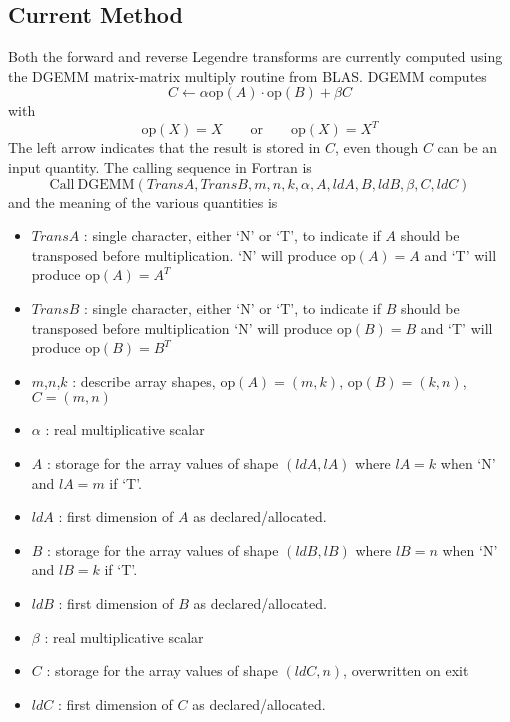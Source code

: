 \documentclass[10pt,letterpaper]{article}
\begin{document}
\subsection{Current Method}
Both the forward and reverse Legendre transforms are currently computed using the DGEMM
matrix-matrix multiply routine from BLAS. DGEMM computes
\begin{equation}
  C \leftarrow \alpha \mathrm{op}\left(A\right)\cdot\mathrm{op}\left(B\right) + \beta C
\end{equation}
with
\begin{equation}
  \mathrm{op}\left(X\right) = X
  \qquad\mathrm{or}\qquad
  \mathrm{op}\left(X\right) = X^T
\end{equation}
The left arrow indicates that the result is stored in $C$, even though $C$ can be
an input quantity. The calling sequence in Fortran is
\begin{equation}
  \mathrm{Call\ DGEMM}\left(TransA,TransB,m,n,k,\alpha,A,ldA,B,ldB,\beta,C,ldC\right)
\end{equation}
and the meaning of the various quantities is
\begin{itemize}
  \item $TransA$ : single character, either `N' or `T', to indicate if $A$ should be
        transposed before multiplication.
        `N' will produce $\mathrm{op}\left(A\right)=A$
        and `T' will produce $\mathrm{op}\left(A\right)=A^T$
  \item $TransB$ : single character, either `N' or `T', to indicate if $B$ should be
        transposed before multiplication
        `N' will produce $\mathrm{op}\left(B\right)=B$
        and `T' will produce $\mathrm{op}\left(B\right)=B^T$
  \item $m$,$n$,$k$ : describe array shapes,
        $\mathrm{op}\left(A\right)=(m,k)$,
        $\mathrm{op}\left(B\right)=(k,n)$,
        $C=(m,n)$
  \item $\alpha$ : real multiplicative scalar
  \item $A$ : storage for the array values of shape $(ldA,lA)$ where $lA=k$ when `N' and
        $lA=m$ if `T'.
  \item $ldA$ : first dimension of $A$ as declared/allocated.
  \item $B$ : storage for the array values of shape $(ldB,lB)$ where $lB=n$ when `N' and
        $lB=k$ if `T'.
  \item $ldB$ : first dimension of $B$ as declared/allocated.
  \item $\beta$ : real multiplicative scalar
  \item $C$ : storage for the array values of shape $(ldC,n)$, overwritten on exit
  \item $ldC$ : first dimension of $C$ as declared/allocated.
\end{itemize}
\end{document}
